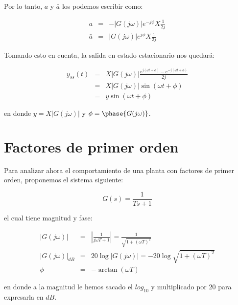     Por lo tanto, $a$ y $\bar{a}$ los podemos escribir como:

    \begin{eqnarray*}
        a & = & - \left| G(j \omega) \right| e^{-j \phi} X \frac{1}{2j} \\
        \bar{a} & = & \left| G(j \omega) \right| e^{j \phi} X \frac{1}{2j}
    \end{eqnarray*}

    Tomando esto en cuenta, la salida en estado estacionario nos quedará:

    \begin{eqnarray*}
        y_{ss}(t) & = & X \left| G(j \omega) \right| \frac{e^{j(\omega t + \phi)} - e^{-j(\omega t + \phi)}}{2j} \\
        & = & X \left| G(j \omega) \right| \sin{(\omega t + \phi)} \\
        & = & y \sin{(\omega t + \phi)}
    \end{eqnarray*}

    en donde $y = X \left| G(j \omega) \right|$ y $\phi = \phase{G(j \omega)}$.


    \newpage
    \section{Factores de primer orden}
        Para analizar ahora el comportamiento de una planta con factores de primer orden, proponemos el sistema siguiente:

        \begin{equation*}
            G(s) = \frac{1}{Ts + 1}
        \end{equation*}

        el cual tiene magnitud y fase:

        \begin{eqnarray*}
            \left| G(j \omega) \right| & = & \left| \frac{1}{j \omega T + 1} \right| = \frac{1}{\sqrt{1 + (\omega T)^2}} \\
            \left| G(j \omega) \right|_{dB} & = & 20 \log{\left| G(j \omega) \right|} = -20 \log{\sqrt{1 + (\omega T)^2}} \\
            \phi & = & - \arctan{(\omega T)}
        \end{eqnarray*}

        en donde a la magnitud le hemos sacado el $log_{10}$ y multiplicado por $20$ para expresarla en $dB$.

